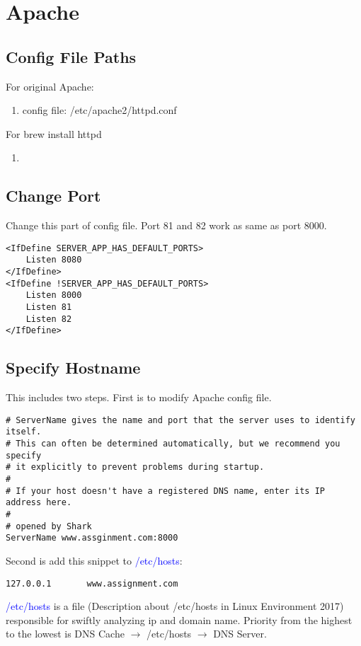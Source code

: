 \section{Apache}
    \subsection{Config File Paths}
    For original Apache:
    \begin{enumerate}
        \item config file: \colorbox{gray!30}{/etc/apache2/httpd.conf}
    \end{enumerate}
    
    For \colorbox{gray!30}{brew install httpd}
    \begin{enumerate}
        \item 
    \end{enumerate}
    
    \subsection{Change Port}
    Change this part of config file. Port 81 and 82 work as same as port 8000.
\begin{lstlisting}
<IfDefine SERVER_APP_HAS_DEFAULT_PORTS>
    Listen 8080
</IfDefine>
<IfDefine !SERVER_APP_HAS_DEFAULT_PORTS>
    Listen 8000
    Listen 81
    Listen 82
</IfDefine>
\end{lstlisting}
    
    \subsection{Specify Hostname}
    This includes two steps. First is to modify Apache config file.
\begin{lstlisting}
# ServerName gives the name and port that the server uses to identify itself.
# This can often be determined automatically, but we recommend you specify
# it explicitly to prevent problems during startup.
#
# If your host doesn't have a registered DNS name, enter its IP address here.
#
# opened by Shark
ServerName www.assginment.com:8000
\end{lstlisting}
Second is add this snippet to \textcolor{blue}{/etc/hosts}:
\begin{lstlisting}
127.0.0.1       www.assignment.com
\end{lstlisting}

\textcolor{blue}{/etc/hosts} is a file (Description about /etc/hosts in Linux Environment 2017) responsible for swiftly analyzing ip and domain name. 
Priority from the highest to the lowest is DNS Cache $\rightarrow$ /etc/hosts $\rightarrow$ DNS Server.


